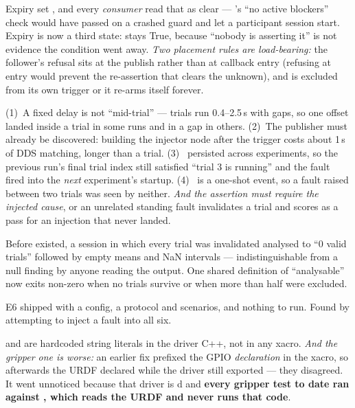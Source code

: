 {Expiry set , and every \emph{consumer} read that as clear
--- 's ``no active blockers'' check would have passed on a
crashed guard and let a participant session start. Expiry is now a third state:
 stays True, because ``nobody is asserting it'' is not evidence
the condition went away. \textit{Two placement rules are load-bearing:} the
follower's refusal sits at the publish rather than at callback entry (refusing
at entry would prevent the re-assertion that clears the unknown), and
 is excluded from its own trigger or it re-arms itself
forever.}

{(1)~A fixed delay is not ``mid-trial'' --- trials run 0.4--2.5\,s with gaps, so
one offset landed inside a trial in some runs and in a gap in others.
(2)~The publisher must already be discovered: building the injector node after
the trigger costs about 1\,s of DDS matching, longer than a trial.
(3)~ persisted across experiments, so the previous run's
final trial index still satisfied ``trial 3 is running'' and the fault fired
into the \emph{next} experiment's startup. (4)~ is a
one-shot event, so a fault raised between two trials was seen by neither.
\textit{And the assertion must require the injected cause}, or an unrelated
standing fault invalidates a trial and scores as a pass for an injection that
never landed.}

{Before  existed, a session in which every trial was
invalidated analysed to ``0 valid trials'' followed by empty means and NaN
intervals --- indistinguishable from a null finding by anyone reading the
output. One shared definition of ``analysable'' now exits non-zero when no
trials survive or when more than half were excluded.}

{E6 shipped with a config, a protocol and scenarios, and nothing to run. Found
by attempting to inject a fault into all six.}

{ and  are hardcoded string literals in
the driver C++, not in any xacro. \textit{And the gripper one is worse:} an
earlier fix prefixed the GPIO \emph{declaration} in the xacro, so afterwards
the URDF declared  while the driver still
exported  --- they disagreed. It went unnoticed
because that driver is d and \textbf{every gripper test to
date ran against , which reads the URDF and never runs
that code}.}

